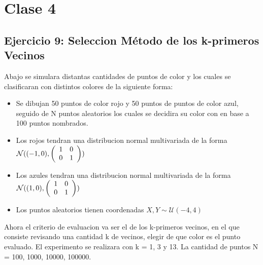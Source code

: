 \documentclass[12pt, a4paper]{article}
\begin{document}
\section{Clase 4}
\subsection{Ejercicio 9: Seleccion Método de los k-primeros Vecinos}

Abajo se simulara distantas cantidades de puntos de color y los cuales se clasificaran con distintos colores de la siguiente forma:
\begin{itemize}
	\item Se dibujan 50 puntos de color rojo y 50 puntos de puntos de color azul, seguido de N puntos aleatorios los cuales se decidira su color con en base a 100 puntos nombrados.
	\item Los rojos tendran una distribucion normal multivariada de la forma $\mathcal{N}((-1,0),
    \left(
        \begin{array}{c c}
            1 & 0 \\
            0 & 1
        \end{array}
    \right)
    )$
	\item Los azules tendran una distribucion normal multivariada de la forma $\mathcal{N}((1,0),
    \left(
        \begin{array}{c c}
            1 & 0 \\
            0 & 1
        \end{array}
    \right)
    )$
	\item Los puntos aleatorios tienen coordenadas $X,Y\sim\mathcal{U}(-4,4)$
\end{itemize}
Ahora el criterio de evaluacion va ser el de los k-primeros vecinos, en el que consiste revisando una cantidad k de vecinos, elegir de que color es el punto evaluado. El experimento se realizara con k = 1, 3 y 13. La cantidad de puntos N = 100, 1000, 10000, 100000.
\end{document}
